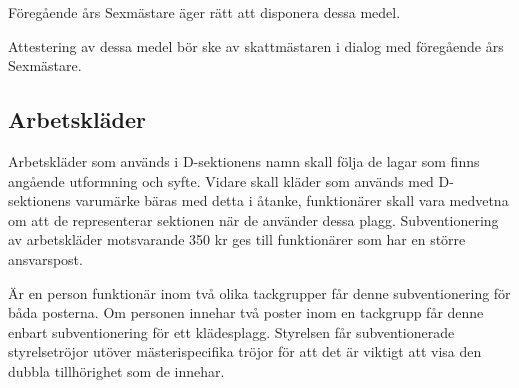 \documentclass{dsekprotokoll}
\begin{document}
Föregående års Sexmästare äger rätt att disponera dessa medel.

Attestering av dessa medel bör ske av skattmästaren i dialog med föregående års Sexmästare.

\subsection{Arbetskläder}
\par Arbetskläder som används i D-sektionens namn skall följa de lagar som finns angående utformning och syfte. Vidare skall kläder som används med D-sektionens varumärke bäras med detta i åtanke, funktionärer skall vara medvetna om att de representerar sektionen när de använder dessa plagg.
Subventionering av arbetskläder motsvarande 350 kr ges till funktionärer som har en större ansvarspost.

\par Är en person funktionär inom två olika tackgrupper får denne subventionering för båda posterna. Om personen innehar två poster inom en tackgrupp får denne enbart subventionering för ett klädesplagg. Styrelsen får subventionerade styrelsetröjor utöver mästerispecifika tröjor för att det är viktigt att visa den dubbla tillhörighet som de innehar.
\end{document}
